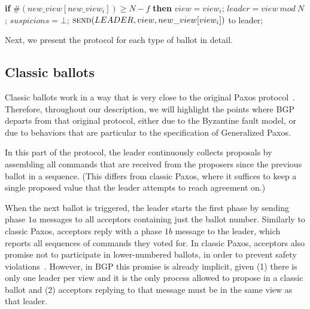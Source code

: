 \begin{algorithm}
\begin{multicols}{2}
\begin{algorithmic}[1]
			\State\hspace{\algorithmicindent} \textbf{if} $\#(new\_view[new\_view_i]) \geq N-f$ \textbf{then}
			\State\hspace{\algorithmicindent}\hspace{\algorithmicindent} $view = view_i$;
			\State\hspace{\algorithmicindent}\hspace{\algorithmicindent} $leader = view\ mod\ N$;
			\State\hspace{\algorithmicindent}\hspace{\algorithmicindent} $suspicions = \bot$;
			\State\hspace{\algorithmicindent}\hspace{\algorithmicindent} $\Call{send}{LEADER, view, new\_view[view_i]}$ to leader;
		\end{algorithmic}
	\end{multicols}
	\vspace*{-.4cm}
\end{algorithm}

Next, we present the protocol for each type of ballot in detail.

\subsection{Classic ballots} 

Classic ballots work in a way that is very close to the original Paxos protocol~\cite{Lam98}. Therefore, throughout our description, we will highlight the points where BGP departs from that original protocol, either due to the Byzantine fault model, or due to behaviors that are particular to the specification of Generalized Paxos.

In this part of the protocol, the leader continuously collects proposals by assembling all commands that are received from the proposers since the previous ballot in a sequence. (This differs from classic Paxos, where it suffices to keep a single proposed value that the leader attempts to reach agreement on.)

When the next ballot is triggered, the leader starts the first phase by sending phase $1a$ messages to all acceptors containing just the ballot number. Similarly to classic Paxos, acceptors reply with a phase $1b$ message to the leader, which reports all sequences of commands they voted for. In classic Paxos, acceptors also promise not to participate in lower-numbered ballots, in order to prevent safety violations~\cite{Lam98}.  However, in BGP this promise is already implicit, given (1) there is only one leader per view and it is the only process allowed to propose in a classic ballot and (2) acceptors replying to that message must be in the same view as that leader.

